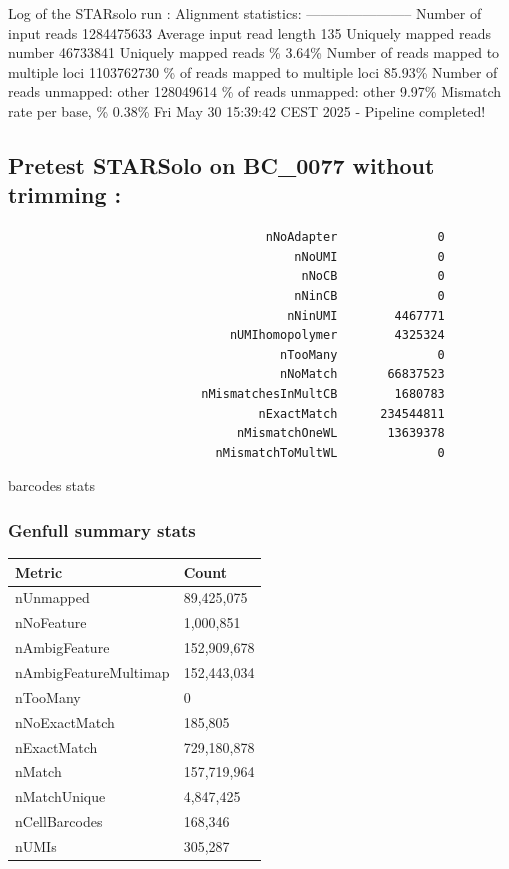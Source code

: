 \documentclass[
  11pt,
  a4paper,
]{report}
\begin{document}
Log of the STARsolo run : Alignment statistics: -----------------------
Number of input reads \textbar{} 1284475633 Average input read length
\textbar{} 135 Uniquely mapped reads number \textbar{} 46733841 Uniquely
mapped reads \% \textbar{} 3.64\% Number of reads mapped to multiple
loci \textbar{} 1103762730 \% of reads mapped to multiple loci
\textbar{} 85.93\% Number of reads unmapped: other \textbar{} 128049614
\% of reads unmapped: other \textbar{} 9.97\% Mismatch rate per base, \%
\textbar{} 0.38\% Fri May 30 15:39:42 CEST 2025 - Pipeline completed!

\subsection{Pretest STARSolo on BC\_0077 without trimming
:}\label{pretest-starsolo-on-bc_0077-without-trimming}

\begin{verbatim}
                                    nNoAdapter              0
                                        nNoUMI              0
                                         nNoCB              0
                                        nNinCB              0
                                       nNinUMI        4467771
                               nUMIhomopolymer        4325324
                                      nTooMany              0
                                      nNoMatch       66837523
                           nMismatchesInMultCB        1680783
                                   nExactMatch      234544811
                                nMismatchOneWL       13639378
                             nMismatchToMultWL              0
\end{verbatim}

barcodes stats

\subsubsection{Genfull summary stats}\label{genfull-summary-stats}

\begin{longtable}[]{@{}ll@{}}
\toprule\noalign{}
Metric & Count \\
\midrule\noalign{}
\endhead
\bottomrule\noalign{}
\endlastfoot
nUnmapped & 89,425,075 \\
nNoFeature & 1,000,851 \\
nAmbigFeature & 152,909,678 \\
nAmbigFeatureMultimap & 152,443,034 \\
nTooMany & 0 \\
nNoExactMatch & 185,805 \\
nExactMatch & 729,180,878 \\
nMatch & 157,719,964 \\
nMatchUnique & 4,847,425 \\
nCellBarcodes & 168,346 \\
nUMIs & 305,287 \\
\end{longtable}
\end{document}
